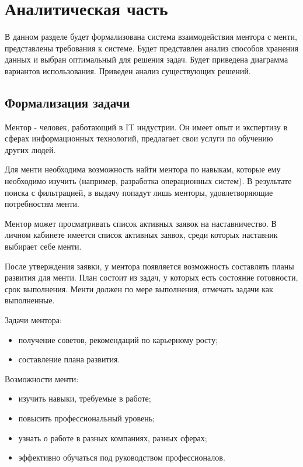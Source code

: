 \chapter{Аналитическая часть}

В данном разделе будет формализована система взаимодействия ментора с менти, представлены требования к системе.
Будет представлен анализ способов хранения данных и выбран оптимальный для решения задач. Будет приведена диаграмма вариантов использования.
Приведен анализ существующих решений.

\section{Формализация задачи}

Ментор - человек, работающий в IT индустрии. Он имеет опыт и экспертизу в сферах информационных технологий, предлагает свои услуги по обучению других людей.

Для менти необходима возможность найти ментора по навыкам, которые ему необходимо изучить (например, разработка операционных систем). В результате поиска с фильтрацией, в выдачу попадут лишь менторы, удовлетворяющие потребностям менти.

Ментор может просматривать список активных заявок на наставничество.
В личном кабинете имеется список активных заявок, среди которых наставник выбирает себе менти.


После утверждения заявки, у ментора появляется возможность составлять планы развития для менти.
План состоит из задач, у которых есть состояние готовности, срок выполнения.
Менти должен по мере выполнения, отмечать задачи как выполненные.
%

Задачи ментора:
\begin{itemize}
    \item получение советов, рекомендаций по карьерному росту;
    \item составление плана развития.
\end{itemize}

Возможности менти:
\begin{itemize}
    \item изучить навыки, требуемые в работе;
    \item повысить профессиональный уровень;
    \item узнать о работе в разных компаниях, разных сферах;
    \item эффективно обучаться под руководством профессионалов.
\end{itemize}

